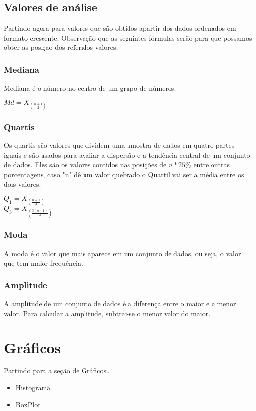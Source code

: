 \documentclass{article}
\begin{document}
\begin{multicols}{2}
  \subsection{Valores de análise}
    Partindo agora para valores que são obtidos apartir dos dados ordenados em formato crescente. Observação que as seguintes fórmulas serão para que possamos obter as posição dos referidos valores.    
    
    \subsubsection{Mediana}
    Mediana é o número no centro de um grupo de números.
    \begin{center}
      $ Md = X_{(\frac{n + 1}{2})} $
    \end{center}

    \subsubsection{Quartis}
    Os quartis são valores que dividem uma amostra de dados em quatro partes iguais e são usados para avaliar a dispersão e a tendência central de um conjunto de dados. Eles são os valores contidos nas posições de $ n*25\% $ entre outras porcentagens, caso "n" dê um valor quebrado o Quartil vai ser a média entre os dois valores.
    \begin{center}
      $ Q_1 = X_{(\frac{n + 1}{4})} $ \\
      $ Q_3 = X_{(\frac{3(n + 1)}{4})} $
    \end{center}

    \subsubsection{Moda}
    A moda é o valor que mais aparece em um conjunto de dados, ou seja, o valor que tem maior frequência.
    
    \subsubsection{Amplitude}
    A amplitude de um conjunto de dados é a diferença entre o maior e o menor valor. Para calcular a amplitude, subtrai-se o menor valor do maior. 

\section{Gráficos}
  Partindo para a seção de Gráficos\dots
  
  \begin{itemize}
    \item Histograma
    \item BoxPlot
  \end{itemize}


\end{multicols} %
\end{document}

